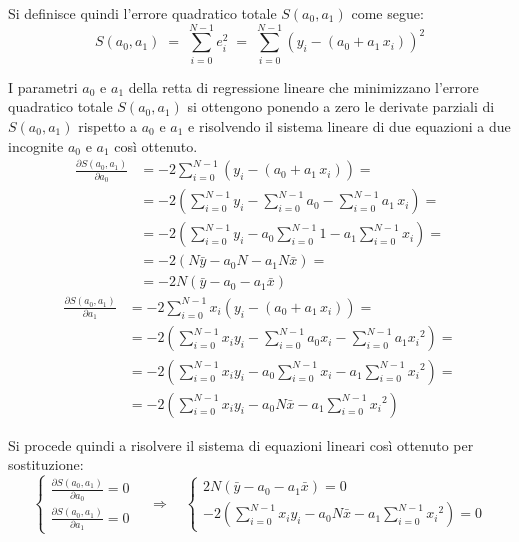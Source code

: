 Si definisce quindi l'errore quadratico totale \(S(a_0, a_1)\) come segue:
\begin{equation}
	S(a_0, a_1) \; = \; \sum_{i = 0}^{N-1} e_i^2 \; = \; \sum_{i = 0}^{N-1} (y_i - (a_0 + a_1 \, x_i))^2
\end{equation}

I parametri \(a_0\) e \(a_1\) della retta di regressione lineare che minimizzano l'errore quadratico totale \(S(a_0, a_1)\)
si ottengono ponendo a zero le derivate parziali di \(S(a_0, a_1)\) rispetto a \(a_0\) e \(a_1\) e risolvendo il sistema
lineare di due equazioni a due incognite \(a_0\) e \(a_1\) così ottenuto.
\begin{align}
	\frac{\partial S(a_0, a_1)}{\partial a_0} &= -2 \sum_{i = 0}^{N-1} (y_i - (a_0 + a_1 \, x_i)) = \\
	&= -2 \left( \sum_{i = 0}^{N-1} y_i - \sum_{i=0}^{N-1} a_0 - \sum_{i=0}^{N-1} a_1 \, x_i \right) = \\
	&= -2 \left( \sum_{i = 0}^{N-1} y_i - a_0 \sum_{i=0}^{N-1} 1 - a_1 \sum_{i=0}^{N-1} x_i \right) = \\
	&= -2 \left( N \bar{y} - a_0 N - a_1 N \bar{x} \right) = \\
	&= -2 N \left( \bar{y} - a_0 - a_1 \bar{x} \right)
\end{align}
\begin{align}
	\frac{\partial S(a_0, a_1)}{\partial a_1} &= -2 \sum_{i = 0}^{N-1} x_i (y_i - (a_0 + a_1 \, x_i)) = \\
	&= -2 \left( \sum_{i = 0}^{N-1} x_i y_i - \sum_{i=0}^{N-1} a_0 x_i - \sum_{i=0}^{N-1} a_1 {x_i}^2 \right) = \\
	&= -2 \left( \sum_{i = 0}^{N-1} x_i y_i - a_0 \sum_{i=0}^{N-1} x_i - a_1 \sum_{i=0}^{N-1} {x_i}^2 \right) = \\
	&= -2 \left( \sum_{i = 0}^{N-1} x_i y_i - a_0 N \bar{x} - a_1 \sum_{i=0}^{N-1} {x_i}^2 \right)
\end{align}

\newpage

Si procede quindi a risolvere il sistema di equazioni lineari così ottenuto per sostituzione:
\begin{equation}
	\begin{cases}
		\frac{\partial S(a_0, a_1)}{\partial a_0} = 0 \\
		\frac{\partial S(a_0, a_1)}{\partial a_1} = 0
	\end{cases}
	\quad \Rightarrow \quad
	\begin{cases}
		2 N \left( \bar{y} - a_0 - a_1 \bar{x} \right) = 0 \\
		-2 \left( \sum_{i = 0}^{N-1} x_i y_i - a_0 N \bar{x} - a_1 \sum_{i=0}^{N-1} {x_i}^2 \right) = 0
	\end{cases}
\end{equation}

